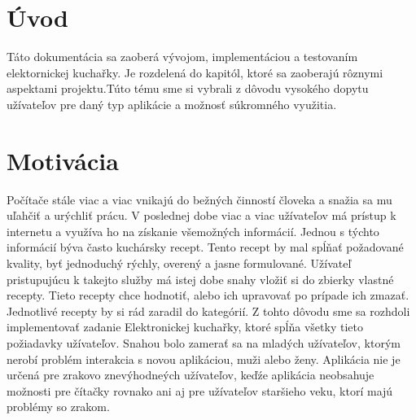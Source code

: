 \documentclass[12pt,a4paper,titlepage,final]{article}
\begin{document}


\tableofcontents
\newpage

\section{Úvod}
Táto dokumentácia sa zaoberá vývojom, implementáciou a testovaním elektornickej kuchařky. Je rozdelená do kapitól, ktoré sa zaoberajú rôznymi aspektami projektu.Túto tému sme si vybrali z dôvodu vysokého dopytu užívateľov pre daný typ aplikácie a možnosť súkromného využitia. 


\section{Motivácia}
Počítače stále viac a viac vnikajú do bežných činností človeka a snažia sa mu uľahčiť a urýchliť prácu. V poslednej dobe viac a viac užívateľov má prístup k internetu a využíva ho na získanie všemožných informácií. Jednou s týchto informácií býva často kuchársky recept. Tento recept by mal spĺňať požadované kvality, byť jednoduchý rýchly, overený a jasne formulované. Užívateľ pristupujúcu k takejto služby má istej dobe snahy vložiť si do zbierky vlastné recepty. Tieto recepty chce hodnotiť, alebo ich upravovať po prípade ich zmazať. Jednotlivé recepty by si rád zaradil do kategórií. Z tohto dôvodu sme sa rozhdoli implementovať zadanie Elektronickej kuchařky, ktoré spĺňa všetky tieto požiadavky užívateľov. Snahou bolo zamerať sa na mladých užívateľov, ktorým nerobí problém interakcia s novou aplikáciou, muži alebo ženy. Aplikácia nie je určená pre zrakovo znevýhodneých užívateľov, keďźe aplikácia neobsahuje možnosti pre čítačky rovnako ani aj pre užívateľov staršieho veku, ktorí majú problémy so zrakom.
\end{document}
